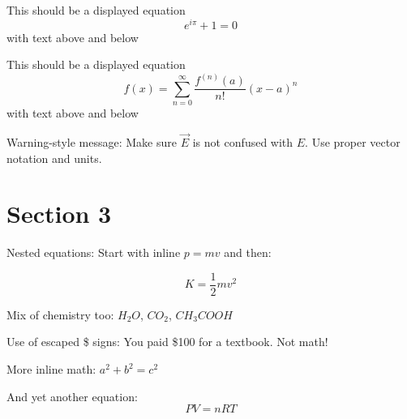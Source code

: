 \documentclass{article}
\newenvironment{callout}
{
}
{ 
}
\begin{document}
This should be a displayed equation
$$
    e^{i\pi} + 1 = 0
$$
with text above and below

This should be a displayed equation
\[
    f(x) = \sum_{n=0}^\infty \frac{f^{(n)}(a)}{n!}(x - a)^n
\]    
with text above and below

\begin{callout}
    Warning-style message: Make sure $\vec{E}$ is not confused with $E$.
    Use proper vector notation and units.
\end{callout}

\section{Section 3}

\begin{callout}
    Nested equations: Start with inline $p = mv$ and then:

    \[
        K = \frac{1}{2}mv^2
    \]

    Mix of chemistry too: $H_2O$, $CO_2$, $CH_3COOH$
\end{callout}

\begin{callout}
    Use of escaped \$ signs: You paid \$100 for a textbook. Not math!
\end{callout}

More inline math: $a^2 + b^2 = c^2$

And yet another equation:
\begin{equation}
    PV = nRT
\end{equation}
\end{document}
